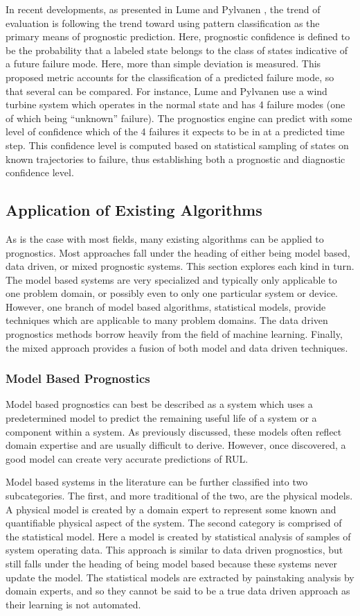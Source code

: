 \documentclass[12pt]{article}
\begin{document}
In recent developments, as presented in Lume and Pylvanen \cite{6299510}, the
trend of evaluation is following the trend toward using pattern classification
as the primary means of prognostic prediction.  Here, prognostic confidence is
defined to be the probability that a labeled state belongs to the class of
states indicative of a future failure mode.  Here, more than simple deviation
is measured.  This proposed metric accounts for the classification of a
predicted failure mode, so that several can be compared.  For instance, Lume
and Pylvanen use a wind turbine system which operates in the normal state and
has 4 failure modes (one of which being ``unknown'' failure).  The prognostics
engine can predict with some level of confidence which of the 4 failures it
expects to be in at a predicted time step.  This confidence level is computed
based on statistical sampling of states on known trajectories to failure, thus
establishing both a prognostic and diagnostic confidence level.


\subsection{Application of Existing Algorithms}
As is the case with most fields, many existing algorithms can be applied to
prognostics.  Most approaches fall under the heading of either being model
based, data driven, or mixed prognostic systems.  This section explores each
kind in turn. The model based systems are very specialized and typically only
applicable to one problem domain, or possibly even to only one particular
system or device.  However, one branch of model based algorithms, statistical
models, provide techniques which are applicable to many problem domains.  The
data driven prognostics methods borrow heavily from the field of machine
learning.  Finally, the mixed approach provides a fusion of both model and data
driven techniques.

\subsubsection{Model Based Prognostics}
Model based prognostics can best be described as a system which uses a
predetermined model to predict the remaining useful life of a system or a
component within a system.  As previously discussed, these models often reflect
domain expertise and are usually difficult to derive.  However, once
discovered, a good model can create very accurate predictions of RUL.  

Model based systems in the literature can be further classified into two
subcategories.  The first, and more traditional of the two, are the physical
models.  A physical model is created by a domain expert to represent some known
and quantifiable physical aspect of the system. The second category is
comprised of the statistical model.  Here a model is created by statistical
analysis of samples of system operating data.  This approach is similar to data
driven prognostics, but still falls under the heading of being model based
because these systems never update the model.  The statistical models are
extracted by painstaking analysis by domain experts, and so they cannot be said
to be a true data driven approach as their learning is not automated.
\end{document}
